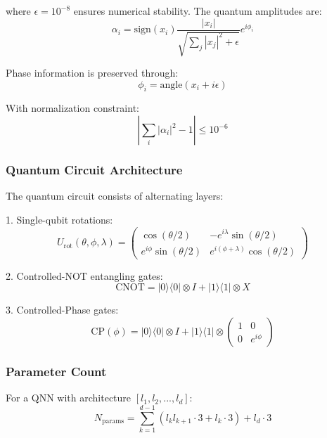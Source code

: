 \documentclass{article}
\begin{document}
where $\epsilon=10^{-8}$ ensures numerical stability. The quantum amplitudes are:
\begin{equation}
\alpha_i = \text{sign}(x_i)\frac{|x_i|}{\sqrt{\sum_j |x_j|^2 + \epsilon}}e^{i\phi_i}
\end{equation}

Phase information is preserved through:
\begin{equation} 
\phi_i = \text{angle}(x_i + i\epsilon)
\end{equation}

With normalization constraint:
\begin{equation}
\left|\sum_i |\alpha_i|^2 - 1\right| \leq 10^{-6}
\end{equation}

\subsubsection{Quantum Circuit Architecture}
The quantum circuit consists of alternating layers:

1. Single-qubit rotations:
\begin{equation}
U_{\text{rot}}(\theta, \phi, \lambda) = 
\begin{pmatrix}
\cos(\theta/2) & -e^{i\lambda}\sin(\theta/2) \\
e^{i\phi}\sin(\theta/2) & e^{i(\phi+\lambda)}\cos(\theta/2)
\end{pmatrix}
\end{equation}

2. Controlled-NOT entangling gates:
\begin{equation}
\text{CNOT} = |0\rangle\langle0| \otimes I + |1\rangle\langle1| \otimes X
\end{equation}

3. Controlled-Phase gates:
\begin{equation}
\text{CP}(\phi) = |0\rangle\langle0| \otimes I + |1\rangle\langle1| \otimes 
\begin{pmatrix}
1 & 0 \\
0 & e^{i\phi}
\end{pmatrix}
\end{equation}

\subsubsection{Parameter Count}
For a QNN with architecture $[l_1, l_2, ..., l_d]$:
\begin{equation}
N_{\text{params}} = \sum_{k=1}^{d-1} (l_k l_{k+1} \cdot 3 + l_k \cdot 3) + l_d \cdot 3
\end{equation}
\end{document}
